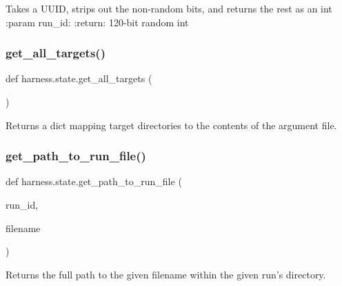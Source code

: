 \begin{DoxyVerb}Takes a UUID, strips out the non-random bits, and returns the rest as an int
:param run_id:
:return: 120-bit random int
\end{DoxyVerb}
 \mbox{\label{namespaceharness_1_1state_a9fec55ee8eadd74fdfa6519d5ed012a6}} 
\subsubsection{\texorpdfstring{get\+\_\+all\+\_\+targets()}{get\_all\_targets()}}
{\footnotesize\ttfamily def harness.\+state.\+get\+\_\+all\+\_\+targets (\begin{DoxyParamCaption}{ }\end{DoxyParamCaption})}

\begin{DoxyVerb}Returns a dict mapping target directories to the contents of the
argument file.
\end{DoxyVerb}
 \mbox{\label{namespaceharness_1_1state_aafb1c21d483c2c252843d0de81f0f9ba}} 
\subsubsection{\texorpdfstring{get\+\_\+path\+\_\+to\+\_\+run\+\_\+file()}{get\_path\_to\_run\_file()}}
{\footnotesize\ttfamily def harness.\+state.\+get\+\_\+path\+\_\+to\+\_\+run\+\_\+file (\begin{DoxyParamCaption}\item[{}]{run\+\_\+id,  }\item[{}]{filename }\end{DoxyParamCaption})}

\begin{DoxyVerb}Returns the full path to the given filename within
the given run's directory.
\end{DoxyVerb}
 \mbox{\label{namespaceharness_1_1state_abb355e4014b234195cc96865107f1931}} 
